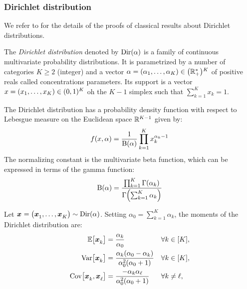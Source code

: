\subsubsection{Dirichlet distribution}

We refer to \cite[Chapter 49]{Kotz2000} for the details of the proofs of classical results about Dirichlet distributions.

The \emph{Dirichlet distribution} denoted by $\mathrm{Dir}(\alpha)$ is a family of continuous multivariate probability distributions.
It is parametrized by a number of categories $K \ge 2$ (integer) and a vector $\alpha=\bracket{\alpha_1,\ldots,\alpha_K}\in\bracket{\RR_+^*}^K$ of positive reals called concentrations parameters.
Its support is a vector $x=\bracket{x_1,\ldots,x_K}\in\bracket{0,1}^K$ oh the $K-1$ simplex \ie such that $\sum_{k=1}^K x_k = 1$.

The Dirichlet distribution has a probability density function with respect to Lebesgue measure on the Euclidean space $\mathbb{R}^{K-1}$ given by:
\begin{equation}\label{eq:dirchlet:probability-density-function}
  f\bracket{x,\alpha} = \frac{1}{ \Beta\bracket{\alpha}}\prod_{k=1}^K x_k^{\alpha_k-1}
\end{equation}
The normalizing constant is the multivariate beta function, which can be expressed in terms of the gamma function:
\begin{equation}
  \Beta\bracket{\alpha} =
  \frac{ \prod_{k=1}^K \Gamma\bracket{\alpha_k} }
       { \Gamma\bracket{\sum_{k=1}^K \alpha_k} }
\end{equation}


Let $\va x=\bracket{\va x_1,\ldots,\va x_K}\sim \Dir\bracket{\alpha}$. Setting $\alpha_0=\sum_{k=1}^K\alpha_k$, the moments of the Dirichlet distribution are:
\begin{subequations}\label{eq:dirchlet:moments}
  \begin{align}
    \espe\sqbracket{\va x_k} &= \frac{\alpha_k}{\alpha_0} && \forall k\in\range{K},
    \label{eq:dirchlet:moments:mean}
    \\
    \vari\sqbracket{\va x_k} &= \frac{\alpha_k\bracket{\alpha_0-\alpha_k}}{\alpha_0^2\bracket{\alpha_0+1}} && \forall k\in\range{K},
    \label{eq:dirchlet:moments:mean}
    \\
    \cova\sqbracket{\va x_k,\va x_{\ell}} &= \frac{-\alpha_k\alpha_{\ell}}{\alpha_0^2\bracket{\alpha_0+1}} && \forall k\ne\ell,
    \label{eq:dirchlet:moments:mean}
  \end{align}
\end{subequations}


